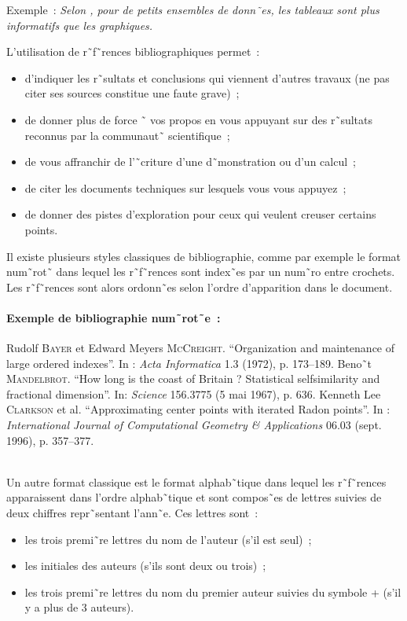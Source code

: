 Exemple~: \emph{Selon \cite{tufte}, pour de petits ensembles de
  donn˜es, les tableaux sont plus informatifs que les graphiques.}

L'utilisation de r˜f˜rences bibliographiques permet~:
\begin{itemize}
\item d'indiquer les r˜sultats et conclusions qui viennent d'autres
  travaux (ne pas citer ses sources constitue une faute grave)~;
\item de donner plus de force ˜ vos propos en vous appuyant sur des r˜sultats
  reconnus par la communaut˜ scientifique~;
\item de vous affranchir de l'˜criture d'une d˜monstration ou d'un calcul~;
\item de citer les documents techniques sur lesquels vous vous appuyez~;
\item de donner des pistes d'exploration pour ceux qui veulent creuser
  certains points.
\end{itemize}

Il existe plusieurs styles classiques de bibliographie, comme par exemple le
format num˜rot˜ dans lequel les r˜f˜rences sont index˜es par un num˜ro entre
crochets. Les r˜f˜rences sont alors ordonn˜es selon l'ordre d'apparition dans
le document.

\paragraph{Exemple de bibliographie num˜rot˜e~:}
\begingroup
\renewcommand{\section}[2]{}%
\begin{thebibliography}{1}
 Rudolf \textsc{Bayer} et Edward Meyers \textsc{McCreight}. ``Organization and
  maintenance of large ordered indexes''. In : \emph{Acta Informatica} 1.3
  (1972), p. 173--189.
 Beno˜t \textsc{Mandelbrot}. ``How long is the coast of Britain ?
  Statistical selfsimilarity and fractional dimension''. In: \emph{Science}
  156.3775 (5 mai 1967), p. 636.
 Kenneth Lee \textsc{Clarkson} et al. ``Approximating center points with
  iterated Radon points''. In : \emph{International Journal of
    Computational Geometry \& Applications} 06.03 (sept. 1996), p. 357--377.
\end{thebibliography}
\endgroup

~\\
Un autre format classique est le format alphab˜tique dans lequel les
r˜f˜rences apparaissent dans l'ordre alphab˜tique et sont compos˜es de lettres
suivies de deux chiffres repr˜sentant l'ann˜e. Ces lettres sont~:
\begin{itemize}
\item les trois premi˜re lettres du nom de l'auteur (s'il est seul)~;
\item les initiales des auteurs (s'ils sont deux ou trois)~;
\item les trois premi˜re lettres du nom du premier auteur suivies du symbole
  \og{}+\fg{} (s'il y a plus de 3 auteurs).
\end{itemize}

